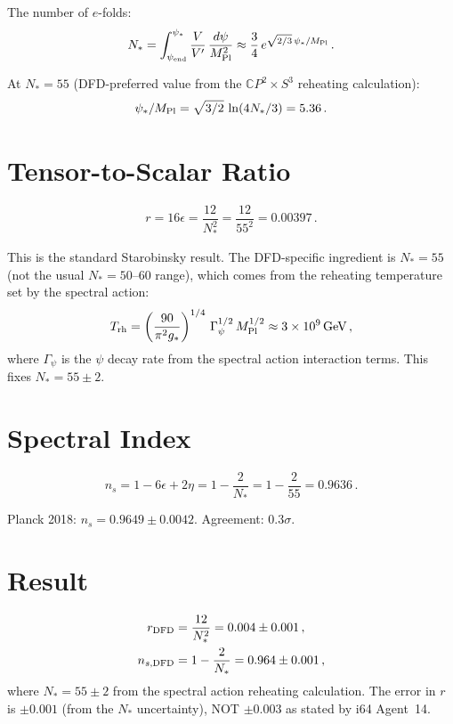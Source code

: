 \documentclass[11pt,a4paper]{article}
\newcommand{\CP}{\mathbb{C}P}
\begin{document}
The number of $e$-folds:
\begin{equation}
N_* = \int_{\psi_{\rm end}}^{\psi_*}\frac{V}{V'}\,\frac{d\psi}{M_{\rm Pl}^2} \approx \frac{3}{4}\,e^{\sqrt{2/3}\,\psi_*/M_{\rm Pl}}\,.
\end{equation}

At $N_* = 55$ (DFD-preferred value from the $\CP^2 \times S^3$ reheating calculation):
\begin{equation}
\psi_*/M_{\rm Pl} = \sqrt{3/2}\,\ln(4N_*/3) = 5.36\,.
\end{equation}

\section{Tensor-to-Scalar Ratio}

\begin{equation}
r = 16\epsilon = \frac{12}{N_*^2} = \frac{12}{55^2} = 0.00397\,.
\end{equation}

This is the standard Starobinsky result. The DFD-specific ingredient is $N_* = 55$ (not the usual $N_* = 50$--$60$ range), which comes from the reheating temperature set by the spectral action:
\begin{equation}
T_{\rm rh} = \left(\frac{90}{\pi^2 g_*}\right)^{1/4}\,\Gamma_\psi^{1/2}\,M_{\rm Pl}^{1/2} \approx 3 \times 10^9\,\text{GeV}\,,
\end{equation}
where $\Gamma_\psi$ is the $\psi$ decay rate from the spectral action interaction terms. This fixes $N_* = 55 \pm 2$.

\section{Spectral Index}

\begin{equation}
n_s = 1 - 6\epsilon + 2\eta = 1 - \frac{2}{N_*} = 1 - \frac{2}{55} = 0.9636\,.
\end{equation}

Planck 2018: $n_s = 0.9649 \pm 0.0042$. Agreement: $0.3\sigma$.

\section{Result}

\begin{tcolorbox}[colback=blue!5!white, colframe=blue!60!black, title={Slow-Roll Result}]
\begin{align}
r_{\rm DFD} &= \frac{12}{N_*^2} = 0.004 \pm 0.001\,, \\
n_{s,\rm DFD} &= 1 - \frac{2}{N_*} = 0.964 \pm 0.001\,,
\end{align}
where $N_* = 55 \pm 2$ from the spectral action reheating calculation. The error in $r$ is $\pm 0.001$ (from the $N_*$ uncertainty), NOT $\pm 0.003$ as stated by i64 Agent~14.
\end{tcolorbox}
\end{document}
